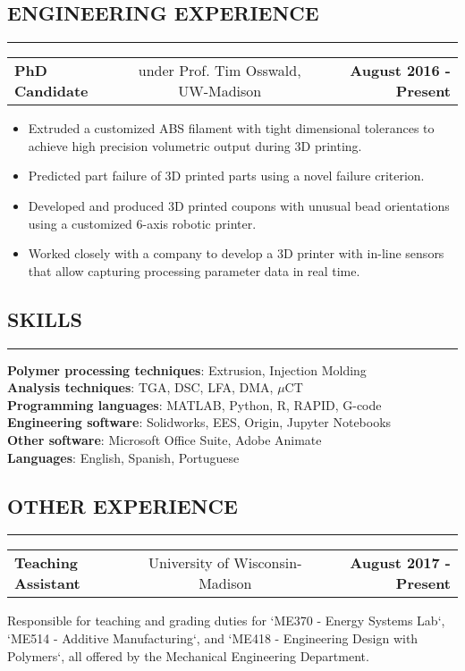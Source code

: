 \documentclass[11pt,letterpaper]{article}
\makeatletter
\newcommand{\headerrow}[3]
{\vspace{0.4em}
\noindent
\begin{tabular*}{\textwidth}{l @{\extracolsep{\fill}} cr}
	\textbf{#1} & %
	#2 &		  %
	\textbf{#3}\\ %
\end{tabular*}}
\makeatother
\begin{document}
\subsection*{ENGINEERING EXPERIENCE}
	\vspace{-0.5em}
	\hrule

	\headerrow
		{PhD Candidate}
		{under Prof. Tim Osswald, UW-Madison}
		{August 2016 - Present}
		
	\begin{itemize}
		\item Extruded a customized ABS filament with tight dimensional tolerances to achieve high precision volumetric output during 3D printing.  
		\item Predicted part failure of 3D printed parts using a novel failure criterion.
		\item Developed and produced 3D printed coupons with unusual bead orientations using a customized 6-axis robotic printer.
		\item Worked closely with a company to develop a 3D printer with in-line sensors that allow capturing processing parameter data in real time.
	\end{itemize}

\subsection*{SKILLS}
\vspace{-0.5em}
\hrule
\vspace{0.4em}

\textbf{Polymer processing techniques}: Extrusion, Injection Molding\\
\textbf{Analysis techniques}: TGA, DSC, LFA, DMA, $\mu$CT\\
\textbf{Programming languages}: MATLAB, Python, R, RAPID, G-code\\
\textbf{Engineering software}: Solidworks, EES, Origin, Jupyter Notebooks\\
\textbf{Other software}: Microsoft Office Suite, Adobe Animate\\
\textbf{Languages}: English, Spanish, Portuguese\\


\subsection*{OTHER EXPERIENCE}

\vspace{-0.5em}
\hrule
	
	\headerrow
		{Teaching Assistant}
		{University of Wisconsin-Madison} 
		{August 2017 - Present}
		Responsible for teaching and grading duties for `ME370 - Energy Systems Lab`, `ME514 - Additive Manufacturing`, and `ME418 - Engineering Design with Polymers`, all offered by the Mechanical Engineering Department. 
	
\end{document}
